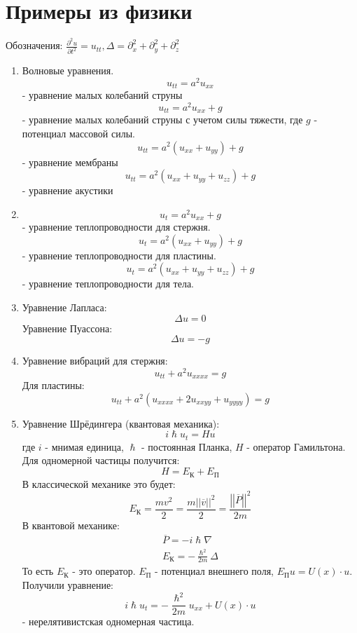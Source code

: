 \section{Примеры из физики}
Обозначения: $\frac{\partial^2 u}{\partial t^2} = u_{tt}, \Delta = \partial_x^2 + \partial_y^2 + \partial_z^2$
\begin{enumerate}
	\item{Волновые уравнения.
			\[
				u_{tt} = a^2 u_{xx}
		\] - уравнение малых колебаний струны
		\[
				u_{tt} = a^2 u_{xx} + g
		\] - уравнение малых колебаний струны с учетом силы тяжести, где $g$ - потенциал массовой силы.
		\[
			u_{tt} = a^2 \left( u_{xx} + u_{yy}\right) + g
		\] - уравнение мембраны
		\[
			u_{tt} = a^2 \left( u_{xx} + u_{yy} + u_{zz}\right) + g
		\] - уравнение акустики
	}
\item{\[
			u_t = a^2 u_{xx} + g
	\] - уравнение теплопроводности для стержня.
	\[
		u_t = a^2 \left( u_{xx} + u_{yy}\right) + g
	\] - уравнение теплопроводности для пластины.
	\[
		u_t = a^2 \left( u_{xx} + u_{yy} + u_{zz}\right) + g
	\] - уравнение теплопроводности для тела.
}
\item{
		Уравнение Лапласа:
		\[
			\Delta u = 0
		\]
		Уравнение Пуассона:
		\[
			\Delta u = -g
		\]
	}
\item{
		Уравнение вибраций для стержня:
		\[
			u_{tt} + a^2 u_{xxxx} = g
		\]
		Для пластины:
		\[
			u_{tt} + a^2 \left(u_{xxxx} + 2 u_{xxyy} + u_{yyyy}\right) = g
		\]
	}
\item{
		Уравнение Шрёдингера (квантовая механика):
		\[
			i \hslash u_t = Hu
		\]
		где $i$ - мнимая единица, $\hslash$ - постоянная Планка, $H$ - оператор Гамильтона. Для одномерной частицы получится:
		\[
			H = E_\text{К} + E_\text{П}
		\]
		В классической механике это будет:
\[
	E_\text{К} = \frac{mv^2}{2} = \frac{m\left| \left| \overline{v}\right| \right|^2}{2} = \frac{\left| \left| \overline{P}\right| \right|^2}{2m}
\]
В квантовой механике:
\[
	\begin{aligned}
		\overline{P} = -i \hslash \nabla \\
		E_\text{К} = -\frac{\hslash^2}{2m} \Delta
	\end{aligned}
\]
То есть $E_\text{К}$ - это оператор. $E_\text{П}$ - потенциал внешнего поля, $E_\text{П}u = U(x) \cdot u$. Получили уравнение:
\[
	i \hslash u_t = -\frac{\hslash^2}{2m} u_{xx} + U(x) \cdot u
\] - нерелятивистская одномерная частица.
	}

\end{enumerate}
